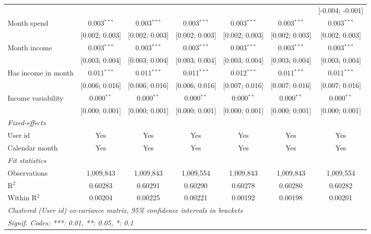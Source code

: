 \begin{table}[htbp]
\begin{threeparttable}[b]
\begin{tabular}{lcccccc}
                                        &                &                &                &                 &                  & [-0.004; -0.001]\\   
         Month spend                    & 0.003$^{***}$  & 0.003$^{***}$  & 0.003$^{***}$  & 0.003$^{***}$   & 0.003$^{***}$    & 0.003$^{***}$\\   
                                        & [0.002; 0.003] & [0.002; 0.003] & [0.002; 0.003] & [0.002; 0.003]  & [0.002; 0.003]   & [0.002; 0.003]\\   
         Month income                   & 0.003$^{***}$  & 0.003$^{***}$  & 0.003$^{***}$  & 0.003$^{***}$   & 0.003$^{***}$    & 0.003$^{***}$\\   
                                        & [0.003; 0.004] & [0.003; 0.004] & [0.003; 0.004] & [0.003; 0.004]  & [0.003; 0.004]   & [0.003; 0.004]\\   
         Has income in month            & 0.011$^{***}$  & 0.011$^{***}$  & 0.011$^{***}$  & 0.012$^{***}$   & 0.011$^{***}$    & 0.011$^{***}$\\   
                                        & [0.006; 0.016] & [0.006; 0.016] & [0.006; 0.016] & [0.007; 0.016]  & [0.007; 0.016]   & [0.007; 0.016]\\   
         Income variability             & 0.000$^{**}$   & 0.000$^{**}$   & 0.000$^{**}$   & 0.000$^{**}$    & 0.000$^{**}$     & 0.000$^{**}$\\   
                                        & [0.000; 0.001] & [0.000; 0.001] & [0.000; 0.001] & [0.000; 0.001]  & [0.000; 0.001]   & [0.000; 0.001]\\   
         \midrule
         \emph{Fixed-effects}\\
         User id                        & Yes            & Yes            & Yes            & Yes             & Yes              & Yes\\  
         Calendar month                 & Yes            & Yes            & Yes            & Yes             & Yes              & Yes\\  
         \midrule
         \emph{Fit statistics}\\
         Observations                   & 1,009,843      & 1,009,843      & 1,009,554      & 1,009,843       & 1,009,843        & 1,009,554\\  
         R$^2$                          & 0.60283        & 0.60291        & 0.60290        & 0.60278         & 0.60280          & 0.60282\\  
         Within R$^2$                   & 0.00204        & 0.00225        & 0.00221        & 0.00192         & 0.00198          & 0.00201\\  
         \midrule \midrule
         \multicolumn{7}{l}{\emph{Clustered (User id) co-variance matrix, 95\% confidence intervals in brackets}}\\
         \multicolumn{7}{l}{\emph{Signif. Codes: ***: 0.01, **: 0.05, *: 0.1}}\\
      \end{tabular}
   \end{threeparttable}
\end{table}


